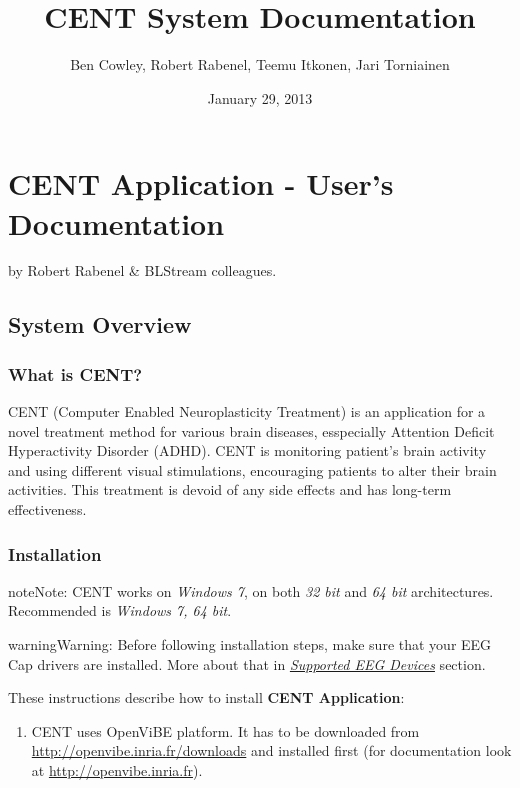 \documentclass[letterpaper,10pt,english]{sphinxmanual}
\title{CENT System Documentation}
\date{January 29, 2013}
\author{Ben Cowley, Robert Rabenel, Teemu Itkonen, Jari Torniainen}
\begin{document}
\maketitle
\tableofcontents
{}\label{index::doc}



\chapter{CENT Application - User's Documentation}
\label{index:table-of-contents}\label{index:cent-application-user-s-documentation}
by Robert Rabenel \& BLStream colleagues.


\section{\textbf{System Overview}}
\label{index:system-overview}

\subsection{\textbf{What is CENT?}}
\label{index:what-is-cent}
CENT (Computer Enabled Neuroplasticity Treatment) is an application for a novel treatment method for various brain diseases, esspecially Attention Deficit Hyperactivity Disorder (ADHD). CENT is monitoring patient's brain activity and using different visual stimulations, encouraging patients to alter their brain activities. This treatment is devoid of any side effects and has long-term effectiveness.


\subsection{\textbf{Installation}}
\label{index:installation}
\begin{notice}{note}{Note:}
CENT works on \emph{Windows 7}, on both \emph{32 bit} and \emph{64 bit} architectures. Recommended is \emph{Windows 7, 64 bit}.
\end{notice}

\begin{notice}{warning}{Warning:}
Before following installation steps, make sure that your EEG Cap drivers are installed. More about that in {\hyperref[index:supported-eeg-devices]{\emph{Supported EEG Devices}}} section.
\end{notice}

These instructions describe how to install \textbf{CENT Application}:
\begin{enumerate}
\item {} 
CENT uses OpenViBE platform. It has to be downloaded from \href{http://openvibe.inria.fr/downloads}{http://openvibe.inria.fr/downloads} and installed first (for documentation look at \href{http://openvibe.inria.fr}{http://openvibe.inria.fr}).

\end{enumerate}
\end{document}
